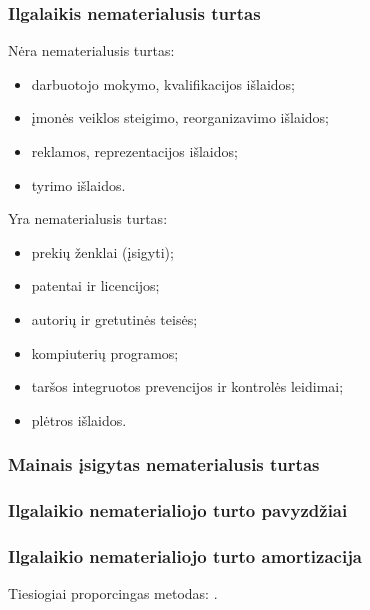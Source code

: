 
\subsubsection{Ilgalaikis nematerialusis turtas}


Nėra nematerialusis turtas:
\begin{itemize}
  \item darbuotojo mokymo, kvalifikacijos išlaidos;
  \item įmonės veiklos steigimo, reorganizavimo išlaidos;
  \item reklamos, reprezentacijos išlaidos;
  \item tyrimo išlaidos.
\end{itemize}

Yra nematerialusis turtas:
\begin{itemize}
  \item prekių ženklai (įsigyti);
  \item patentai ir licencijos;
  \item autorių ir gretutinės teisės;
  \item kompiuterių programos;
  \item taršos integruotos prevencijos ir kontrolės leidimai;
  \item plėtros išlaidos.
\end{itemize}

\subsubsection{Mainais įsigytas nematerialusis turtas}


\subsubsection{Ilgalaikio nematerialiojo turto pavyzdžiai}




\subsubsection{Ilgalaikio nematerialiojo turto amortizacija}


Tiesiogiai proporcingas metodas: .

